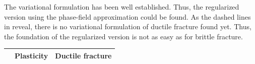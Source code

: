 \begin{table}[!ht]
\begin{center}
\begin{tabular}{|c||c|c|c|}
		\hline
	\end{tabular}
	\end{center}
 \label{fig:elastic}
\end{table}
The variational formulation has been well established. Thus, the regularized version using the phase-field approximation could be found. As the dashed lines in  reveal, there is no variational formulation of ductile fracture found yet. Thus, the foundation of the regularized version is not as easy as for brittle fracture.

\begin{table}
	\begin{center}
	\begin{tabular}{|c||c|c|c|}
		\cline{2-4}
			\multicolumn{1}{c||}{}& Plasticity & \multicolumn{2}{c|}{Ductile fracture} \\
 		\hline\hline

\end{tabular}
\end{center}
\end{table}
